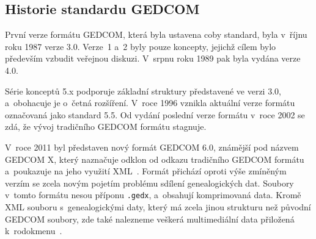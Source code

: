 		\subsection*{Historie standardu GEDCOM}
		První verze formátu GEDCOM, která byla ustavena coby standard, byla v~říjnu roku 1987 verze 3.0. Verze~1 a~2 byly pouze koncepty, jejichž cílem bylo především vzbudit veřejnou diskuzi. V~srpnu roku 1989 pak byla vydána verze 4.0. \par
		Série konceptů 5.x podporuje základní struktury představené ve verzi 3.0, a~obohacuje je o~četná rozšíření. V~roce 1996 vznikla aktuální verze formátu označovaná jako standard 5.5. Od vydání poslední verze formátu v~roce 2002 se zdá, že vývoj tradičního GEDCOM formátu stagnuje. \par
		V~roce 2011 byl představen nový formát GEDCOM 6.0, známější pod názvem GEDCOM X, který naznačuje odklon od odkazu tradičního GEDCOM formátu a~poukazuje na jeho využití XML~\cite{bib:GedcomXOrig}. Formát přichází oproti výše zmíněným verzím se zcela novým pojetím problému sdílení genealogických dat. Soubory v~tomto formátu nesou příponu \texttt{.gedx}, a~obsahují komprimovaná data. Kromě XML souboru s~genealogickými daty, který má zcela jinou strukturu než původní GEDCOM soubory, zde také nalezneme veškerá multimediální data přiložená k~rodokmenu~\cite{bib:GedcomXHome}. \par
		
